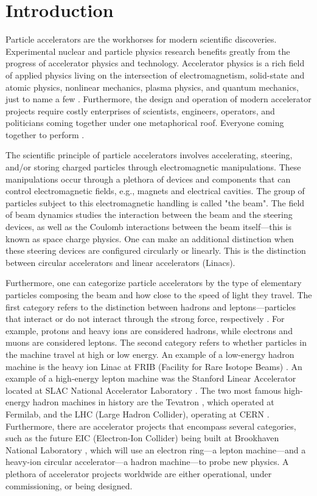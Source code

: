 \chapter{Introduction}
\label{sec:ch1}
 
Particle accelerators are the workhorses for modern scientific discoveries. Experimental nuclear and particle physics research benefits greatly from the progress of accelerator physics and technology. Accelerator physics is a rich field of applied physics living on the intersection of electromagnetism, solid-state and atomic physics, nonlinear mechanics, plasma physics, and quantum mechanics, just to name a few \cite{sylee}. Furthermore, the design and operation of modern accelerator projects require costly enterprises of scientists, engineers, operators, and politicians coming together under one metaphorical roof. Everyone coming together to perform  \cite{fermilab1}.         

The scientific principle of particle accelerators involves accelerating, steering, and/or storing charged particles through electromagnetic manipulations. These manipulations occur through a plethora of devices and components that can control electromagnetic fields, e.g., magnets and electrical cavities. The group of particles subject to this electromagnetic handling is called "the beam". The field of beam dynamics studies the interaction between the beam and the steering devices, as well as the Coulomb interactions between the beam itself---this is known as space charge physics. One can make an additional distinction when these steering devices are configured circularly or linearly. This is the distinction between circular accelerators and linear accelerators (Linacs).

Furthermore, one can categorize particle accelerators by the type of elementary particles composing the beam and how close to the speed of light they travel. The first category refers to the distinction between hadrons and leptons---particles that interact or do not interact through the strong force, respectively \cite{griffiths}. For example, protons and heavy ions are considered hadrons, while electrons and muons are considered leptons. The second category refers to whether particles in the machine travel at high or low energy. An example of a low-energy hadron machine is the heavy ion Linac at FRIB (Facility for Rare Isotope Beams) \cite{frib}. An example of a high-energy lepton machine was the Stanford Linear Accelerator located at SLAC National Accelerator Laboratory \cite{slac}. The two most famous high-energy hadron machines in history are the Tevatron \cite{tevatron}, which operated at Fermilab, and the LHC (Large Hadron Collider), operating at CERN \cite{lhc}. Furthermore, there are accelerator projects that encompass several categories, such as the future EIC (Electron-Ion Collider) being built at Brookhaven National Laboratory \cite{eic}, which will use an electron ring---a lepton machine---and a heavy-ion circular accelerator---a hadron machine---to probe new physics. A plethora of accelerator projects worldwide are either operational, under commissioning, or being designed. 

